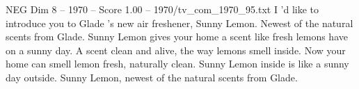 \begin{textsample}{NEG Dim 8 – 1970 – Score 1.00 – 1970/tv\_com\_1970\_95.txt}  \label{ex:f8_neg_020}
I 'd like to introduce you to Glade 's new air freshener, Sunny Lemon.
Newest of the natural scents from Glade.
Sunny Lemon gives your home a scent like fresh lemons have on a sunny day.
A scent clean and alive, the way lemons smell inside.
Now your home can smell lemon fresh, naturally clean.
Sunny Lemon inside is like a sunny day outside.
Sunny Lemon, newest of the natural scents from Glade.

\end{textsample}
